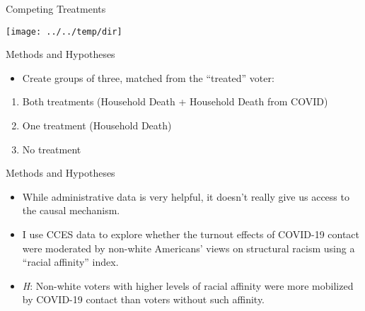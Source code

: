 \documentclass[
  ignorenonframetext,
  aspectratio=169]{beamer}
\providecommand{\tightlist}{%
  \setlength{\itemsep}{0pt}\setlength{\parskip}{0pt}}
\begin{document}
\begin{frame}{Competing Treatments}
\protect\hypertarget{competing-treatments-3}{}
\begin{center}\texttt{[image: ../../temp/dir]} \end{center}
\end{frame}

\begin{frame}{Methods and Hypotheses}
\protect\hypertarget{methods-and-hypotheses}{}
\begin{itemize}[<+->]
\tightlist
\item
  Create groups of three, matched from the ``treated'' voter:
\end{itemize}

\begin{enumerate}[<+->]
\tightlist
\item
  Both treatments (Household Death + Household Death from COVID)
\end{enumerate}

\begin{enumerate}[<+->]
\setcounter{enumi}{1}
\tightlist
\item
  One treatment (Household Death)
\end{enumerate}

\begin{enumerate}[<+->]
\setcounter{enumi}{2}
\tightlist
\item
  No treatment
\end{enumerate}
\end{frame}

\begin{frame}{Methods and Hypotheses}
\protect\hypertarget{methods-and-hypotheses-1}{}
\begin{itemize}[<+->]
\tightlist
\item
  While administrative data is very helpful, it doesn't really give us
  access to the causal mechanism.
\end{itemize}

\begin{itemize}[<+->]
\tightlist
\item
  I use CCES data to explore whether the turnout effects of COVID-19
  contact were moderated by non-white Americans' views on structural
  racism using a ``racial affinity'' index.
\end{itemize}

\begin{itemize}[<+->]
\tightlist
\item
  \emph{H}: Non-white voters with higher levels of racial affinity were
  more mobilized by COVID-19 contact than voters without such affinity.
\end{itemize}
\end{frame}
\end{document}
